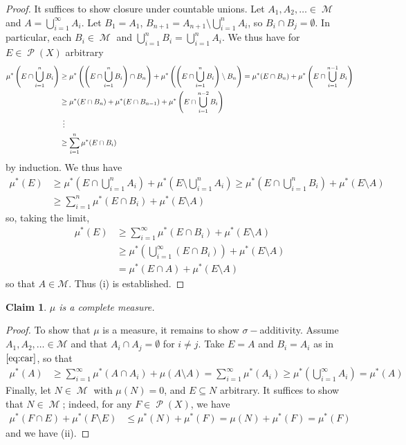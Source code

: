 \documentclass[11pt, a4paper]{memoir}
\newcommand{\agvdots}{\ensuremath{\hspace{0.16cm}\vdots}}
\theoremstyle{change}
\theoremstyle{plain}
\newtheorem{claim}{Claim}
\theoremstyle{nonumberplain}
\newtheorem{proof}{Proof}
\DeclareMathOperator{\M}{{\mathcal{M}}}
\DeclareMathOperator{\ps}{{\mathcal{P}}}
\numberwithin{equation}{section}
\begin{document}
\begin{proof}
    It suffices to show closure under countable unions.
    Let $A_1,A_2,\ldots\in\M$ and $A=\bigcup_{i=1}^\infty A_i$.
    Let $B_1=A_1$, $B_{n+1}=A_{n+1}\setminus\bigcup_{i=1}^n A_i$, so $B_i\cap B_j=\emptyset$.
    In particular, each $B_i\in \M$ and $\bigcup_{i=1}^n B_i=\bigcup_{i=1}^n A_i$.
    We thus have for $E\in\ps(X)$ arbitrary
    \begin{align*}
        \mu^*\left(E\cap\bigcup_{i=1}^n B_i\right) &\geq\mu^*\left(\left(E\cap\bigcup_{i=1}^nB_i\right)\cap B_n\right)+\mu^*\left(\left(E\cap\bigcup_{i=1}^n B_i\right)\setminus B_n\right)= \mu^*(E\cap B_n)+\mu^*\left(E\cap\bigcup_{i=1}^{n-1}B_i\right)\\
                                                   &\geq \mu^*(E\cap B_n)+\mu^*(E\cap B_{n-1})+\mu^*\left(E\cap\bigcup_{i=1}^{n-2}B_i\right)\\
                                                   &\agvdots\\
                                                   &\geq \sum\limits_{i=1}^n \mu^*(E\cap B_i)
    \end{align*}
    by induction.
    We thus have
    \begin{align*}
        \mu^*(E) &\geq\mu^*\left(E\cap\bigcup_{i=1}^n A_i\right)+\mu^*\left(E\setminus\bigcup_{i=1}^n A_i\right)\geq\mu^*\left(E\cap\bigcup_{i=1}^n B_i\right)+\mu^*(E\setminus A)\\
                 &\geq\sum\limits_{i=1}^n\mu^*(E\cap B_i)+\mu^*(E\setminus A)
    \end{align*}
    so, taking the limit,
    \begin{align}
        \mu^*(E) &\geq\sum\limits_{i=1}^\infty\mu^*(E\cap B_i)+\mu^*(E\setminus A)\label{eq:car}\\
                 &\geq\mu^*\left(\bigcup_{i=1}^\infty(E\cap B_i)\right)+\mu^*(E\setminus A)\nonumber\\
                 &=\mu^*(E\cap A)+\mu^*(E\setminus A)\nonumber
    \end{align}
    so that $A\in\mathcal{M}$.
    Thus (i) is established.
\end{proof}
\begin{claim}
    $\mu$ is a complete measure.
\end{claim}
\begin{proof}
    To show that $\mu$ is a measure, it remains to show $\sigma-$additivity.
    Assume $A_1,A_2,\ldots\in\mathcal{M}$ and that $A_i\cap A_j=\emptyset$ for $i\neq j$.
    Take $E=A$ and $B_i=A_i$ as in $\cref{eq:car}$, so that
    \begin{align*}
        \mu^*(A) &\geq \sum\limits_{i=1}^\infty \mu^*(A\cap A_i)+\mu(A\setminus A)= \sum\limits_{i=1}^\infty \mu^*(A_i)\geq \mu^*\left(\bigcup_{i=1}^\infty A_i\right)=\mu^*(A)
    \end{align*}
    Finally, let $N\in\M$ with $\mu(N)=0$, and $E\subseteq N$ arbitrary.
    It suffices to show that $N\in\M$; indeed, for any $F\in\ps(X)$, we have
    \begin{align*}
        \mu^*(F\cap E)+\mu^*(F\setminus E) &\leq \mu^*(N)+\mu^*(F)= \mu(N)+\mu^*(F)= \mu^*(F)
    \end{align*}
    and we have (ii).
\end{proof}
\end{document}
